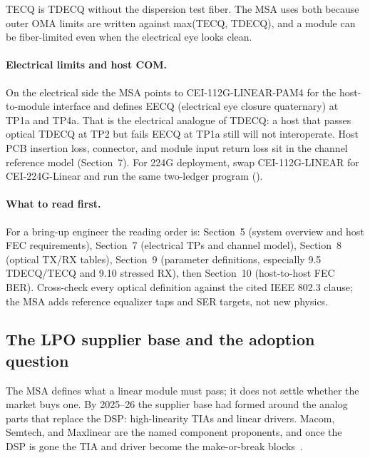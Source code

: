 TECQ is TDECQ without the dispersion test fiber. The MSA uses both because outer
OMA limits are written against max(TECQ, TDECQ), and a module can be fiber-limited
even when the electrical eye looks clean.

\paragraph{Electrical limits and host COM.}
On the electrical side the MSA points to CEI-112G-LINEAR-PAM4 for the host-to-module
interface and defines EECQ (electrical eye closure quaternary) at TP1a and TP4a.
That is the electrical analogue of TDECQ: a host that passes optical TDECQ at TP2
but fails EECQ at TP1a still will not interoperate. Host PCB insertion loss,
connector, and module input return loss sit in the channel reference model
(Section~7). For 224G deployment, swap CEI-112G-LINEAR for CEI-224G-Linear and run
the same two-ledger program ().

\paragraph{What to read first.}
For a bring-up engineer the reading order is: Section~5 (system overview and host
FEC requirements), Section~7 (electrical TPs and channel model), Section~8
(optical TX/RX tables), Section~9 (parameter definitions, especially 9.5 TDECQ/TECQ
and 9.10 stressed RX), then Section~10 (host-to-host FEC BER). Cross-check every
optical definition against the cited IEEE 802.3 clause; the MSA adds reference
equalizer taps and SER targets, not new physics.


\subsection{The LPO supplier base and the adoption question}
\label{sec:lpo-market}

The MSA defines what a linear module must pass; it does not settle whether the
market buys one. By 2025--26 the supplier base had formed around the analog parts
that replace the DSP: high-linearity TIAs and linear drivers. Macom, Semtech, and
Maxlinear are the named component proponents, and once the DSP is gone the TIA and
driver become the make-or-break blocks~\cite{lpo}.

